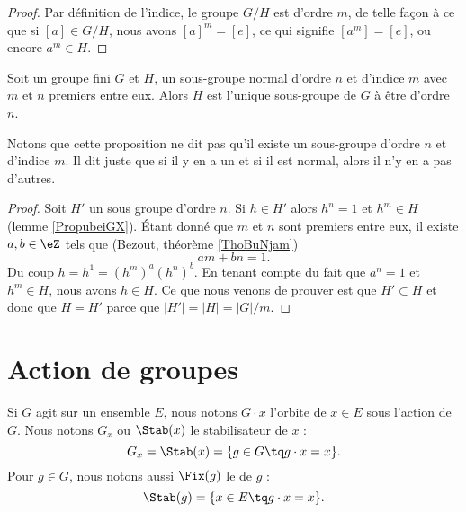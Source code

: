 \begin{proof}
    Par définition de l'indice, le groupe \( G/H\) est d'ordre \( m\), de telle façon à ce que si \( [a]\in G/H\), nous avons \( [a]^m=[e]\), ce qui signifie \( [a^m]=[e]\), ou encore \( a^m\in H\).
\end{proof}

\begin{proposition}
    Soit un groupe fini \( G\) et \( H\), un sous-groupe normal d'ordre \( n\) et d'indice \( m\) avec \( m\) et \( n\) premiers entre eux. Alors \( H\) est l'unique sous-groupe de \( G\) à être d'ordre \( n\).
\end{proposition}
Notons que cette proposition ne dit pas qu'il existe un sous-groupe d'ordre \( n\) et d'indice \( m\). Il dit juste que si il y en a un et si il est normal, alors il n'y en a pas d'autres.

\begin{proof}
    Soit \( H'\) un sous groupe d'ordre \( n\). Si \( h\in H'\) alors \( h^n=1\) et \( h^m\in H\) (lemme \ref{PropubeiGX}). Étant donné que \( m\) et \( n\) sont premiers entre eux, il existe \( a,b\in \eZ\) tels que (Bezout, théorème \ref{ThoBuNjam})
    \begin{equation}
        am+bn=1.
    \end{equation}
    Du coup \( h=h^1=(h^m)^a(h^n)^b\). En tenant compte du fait que \( a^n=1\) et \( h^m\in H\), nous avons \( h\in H\). Ce que nous venons de prouver est que \( H'\subset H\) et donc que \( H=H'\) parce que \( | H' |=| H |=| G |/m\).
\end{proof}
\section{Action de groupes}

Si \( G\) agit sur un ensemble \( E\), nous notons \( G\cdot x\) l'orbite de \( x\in E\) sous l'action de $G$. Nous notons \( G_x\) ou \( \Stab(x)\) le stabilisateur de \( x\) :
\begin{equation}
    G_x=\Stab(x)=\{ g\in G\tq g\cdot x=x \}.
\end{equation}
Pour \( g\in G\), nous notons aussi \( \Fix(g)\) le  de \( g\) :
\begin{equation}
    \Stab(g)=\{ x\in E\tq g\cdot x=x \}.
\end{equation}

